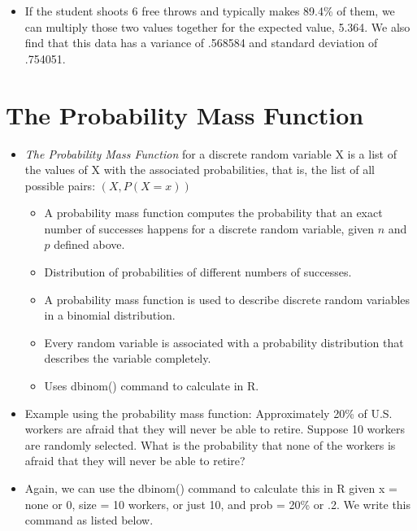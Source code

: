 \documentclass[
  letterpaper,
  DIV=11,
  numbers=noendperiod]{scrreprt}
\providecommand{\tightlist}{%
  \setlength{\itemsep}{0pt}\setlength{\parskip}{0pt}}\usepackage{longtable,booktabs,array}
\begin{document}
\begin{itemize}
\begin{verbatim}
[1] 0.7540451
\end{verbatim}
\item
  If the student shoots 6 free throws and typically makes 89.4\% of
  them, we can multiply those two values together for the expected
  value, 5.364. We also find that this data has a variance of .568584
  and standard deviation of .754051.
\end{itemize}

\section{The Probability Mass
Function}\label{the-probability-mass-function}

\begin{itemize}
\tightlist
\item
  \emph{The Probability Mass Function} for a discrete random variable X
  is a list of the values of X with the associated probabilities, that
  is, the list of all possible pairs: \((X, P(X=x))\)

  \begin{itemize}
  \tightlist
  \item
    A probability mass function computes the probability that an exact
    number of successes happens for a discrete random variable, given
    \(n\) and \(p\) defined above.
  \item
    Distribution of probabilities of different numbers of successes.
  \item
    A probability mass function is used to describe discrete random
    variables in a binomial distribution.
  \item
    Every random variable is associated with a probability distribution
    that describes the variable completely.
  \item
    Uses dbinom() command to calculate in R.
  \end{itemize}
\item
  Example using the probability mass function: Approximately 20\% of
  U.S. workers are afraid that they will never be able to retire.
  Suppose 10 workers are randomly selected. What is the probability that
  none of the workers is afraid that they will never be able to retire?
\item
  Again, we can use the dbinom() command to calculate this in R given x
  = none or 0, size = 10 workers, or just 10, and prob = 20\% or .2. We
  write this command as listed below.\\
\end{itemize}
\end{document}
